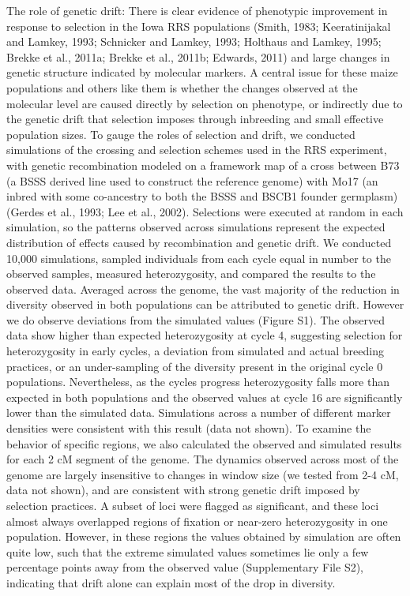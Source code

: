 	The role of genetic drift:  There is clear evidence of phenotypic improvement in response to selection in the Iowa RRS populations (Smith, 1983; Keeratinijakal and Lamkey, 1993; Schnicker and Lamkey, 1993; Holthaus and Lamkey, 1995; Brekke et al., 2011a; Brekke et al., 2011b; Edwards, 2011) and large changes in genetic structure indicated by molecular markers. A central issue for these maize populations and others like them is whether the changes observed at the molecular level are caused directly by selection on phenotype, or indirectly due to the genetic drift that selection imposes through inbreeding and small effective population sizes. To gauge the roles of selection and drift, we conducted simulations of the crossing and selection schemes used in the RRS experiment, with genetic recombination modeled on a framework map of a cross between B73 (a BSSS derived line used to construct the reference genome) with Mo17 (an inbred with some co-ancestry to both the BSSS and BSCB1 founder germplasm)(Gerdes et al., 1993; Lee et al., 2002). Selections were executed at random in each simulation, so the patterns observed across simulations represent the expected distribution of effects caused by recombination and genetic drift. We conducted 10,000 simulations, sampled individuals from each cycle equal in number to the observed samples, measured heterozygosity, and compared the results to the observed data. 	
	Averaged across the genome, the vast majority of the reduction in diversity observed in both populations can be attributed to genetic drift. However we do observe deviations from the simulated values (Figure S1). The observed data show higher than expected heterozygosity at cycle 4, suggesting selection for heterozygosity in early cycles, a deviation from simulated and actual breeding practices, or an under-sampling of the diversity present in the original cycle 0 populations. Nevertheless, as the cycles progress heterozygosity falls more than expected in both populations and the observed values at cycle 16 are significantly lower than the simulated data.  Simulations across a number of different marker densities were consistent with this result (data not shown). 
 To examine the behavior of specific regions, we also calculated the observed and simulated results for each 2 cM segment of the genome. The dynamics observed across most of the genome are largely insensitive to changes in window size (we tested from 2-4 cM, data not shown), and are consistent with strong genetic drift imposed by selection practices. A subset of loci were flagged as significant, and these loci almost always overlapped regions of fixation or near-zero heterozygosity in one population. However, in these regions the values obtained by simulation are often quite low, such that the extreme simulated values sometimes lie only a few percentage points away from the observed value (Supplementary File S2), indicating that drift alone can explain most of the drop in diversity. 
